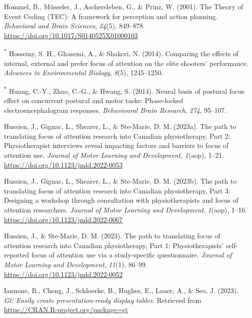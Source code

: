 \documentclass[
  man, donotrepeattitle,floatsintext]{apa7}
\newlength{\cslhangindent}
\newlength{\cslentryspacingunit} %
\newenvironment{CSLReferences}[2] %
 {%
  \setlength{\parindent}{0pt}
  \ifodd #1
  \let\oldpar\par
  \def\par{\hangindent=\cslhangindent\oldpar}
  \fi
  \setlength{\parskip}{#2\cslentryspacingunit}
 }%
 {}
\begin{document}
\begin{CSLReferences}{1}{0}
\leavevmode{}%
Hommel, B., Müsseler, J., Aschersleben, G., \& Prinz, W. (2001). The {Theory} of {Event Coding} ({TEC}): {A} framework for perception and action planning. \emph{Behavioral and Brain Sciences}, \emph{24}(5), 849--878. \url{https://doi.org/10.1017/S0140525X01000103}

\leavevmode{}%
\textsuperscript{*} Hosseiny, S. H., Ghasemi, A., \& Shakeri, N. (2014). Comparing the effects of internal, external and prefer focus of attention on the elite shooters' performance. \emph{Advances in Environmental Biology}, \emph{8}(5), 1245--1250.

\leavevmode{}%
\textsuperscript{*} Huang, C.-Y., Zhao, C.-G., \& Hwang, S. (2014). Neural basis of postural focus effect on concurrent postural and motor tasks: Phase-locked electroencephalogram responses. \emph{Behavioural Brain Research}, \emph{274}, 95--107.

\leavevmode{}%
Hussien, J., Gignac, L., Shearer, L., \& Ste-Marie, D. M. (2023a). The path to translating focus of attention research into {Canadian} physiotherapy, {Part} 2: {Physiotherapist} interviews reveal impacting factors and barriers to focus of attention use. \emph{Journal of Motor Learning and Development}, \emph{1}(aop), 1--21. \url{https://doi.org/10.1123/jmld.2022-0053}

\leavevmode{}%
Hussien, J., Gignac, L., Shearer, L., \& Ste-Marie, D. M. (2023b). The path to translating focus of attention research into {Canadian} physiotherapy, {Part} 3: {Designing} a workshop through consultation with physiotherapists and focus of attention researchers. \emph{Journal of Motor Learning and Development}, \emph{1}(aop), 1--16. \url{https://doi.org/10.1123/jmld.2022-0067}

\leavevmode{}%
Hussien, J., \& Ste-Marie, D. M. (2023). The path to translating focus of attention research into {Canadian} physiotherapy, {Part} 1: {Physiotherapists}' self-reported focus of attention use via a study-specific questionnaire. \emph{Journal of Motor Learning and Development}, \emph{11}(1), 86--99. \url{https://doi.org/10.1123/jmld.2022-0052}

\leavevmode{}%
Iannone, R., Cheng, J., Schloerke, B., Hughes, E., Lauer, A., \& Seo, J. (2023). \emph{Gt: Easily create presentation-ready display tables}. Retrieved from \url{https://CRAN.R-project.org/package=gt}


\end{CSLReferences}
\end{document}
